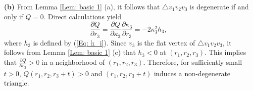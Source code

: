 \documentclass[12pt]{amsart}
\theoremstyle{definition}
\begin{document}
\textbf{(b)} 
From Lemma \ref{Lem: basic 1} (a), it follows that $\triangle v_1v_2v_3$ is degenerate if and only if $Q=0$. 
Direct calculations yield 
\begin{equation*}
\frac{\partial Q}{\partial r_3}=\frac{\partial Q}{\partial \kappa_3}\frac{\partial \kappa_3}{\partial r_3}=-2\kappa^2_3 h_3,
\end{equation*}
where $h_3$ is defined by (\ref{Eq: h_i}).
Since $v_3$ is the flat vertex of $\triangle v_1v_2v_3$, it follows from Lemma \ref{Lem: basic 1} (c) that $h_3<0$ at $(r_1,r_2,r_3)$. 
This implies that $\frac{\partial Q}{\partial r_3}>0$ in a neighborhood of $(r_1, r_2, r_3)$. 
Therefore, for sufficiently small $t>0$, $Q(r_1,r_2,r_3+t)>0$ and $(r_1,r_2,r_3+t)$ induces a non-degenerate triangle. 
\end{document}

